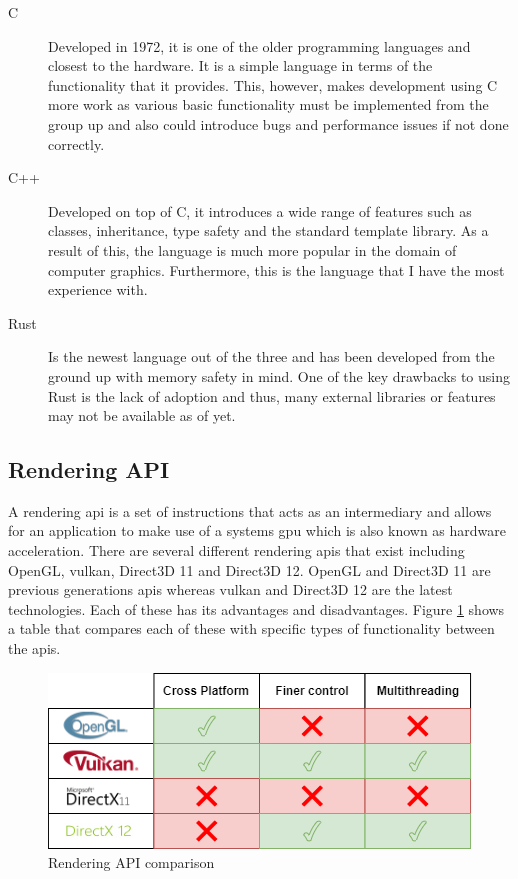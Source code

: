 \documentclass[11pt]{article}
\begin{document}
\begin{description}
  \item[C] Developed in 1972, it is one of the older programming languages and
    closest to the hardware. It is a simple language in terms of the
    functionality that it provides. This, however, makes development using C
    more work as various basic functionality must be implemented from the group
    up and also could introduce bugs and performance issues if not done
    correctly.
  \item[C++] Developed on top of C, it introduces a wide range of features such
    as classes, inheritance, type safety and the standard template library. As a
    result of this, the language is much more popular in the domain of computer
    graphics. Furthermore, this is the language that I have the most experience
    with.
  \item[Rust] Is the newest language out of the three and has been developed
    from the ground up with memory safety in mind. One of the key drawbacks to
    using Rust is the lack of adoption and thus, many external libraries or
    features may not be available as of yet.
\end{description}

\subsection{Rendering API} \label{rendering_api_tech_review} 

A rendering \gls*{api} is a set of instructions that acts as an intermediary and
allows for an application to make use of a systems \gls*{gpu} which is also
known as hardware acceleration. There are several different rendering
\glspl*{api} that exist including OpenGL, \gls*{vulkan}, Direct3D 11 and
Direct3D 12. OpenGL and Direct3D 11 are previous generations \glspl*{api}
whereas \gls*{vulkan} and Direct3D 12 are the latest technologies. Each of these
has its advantages and disadvantages. Figure \ref{fig:api_comparison} shows a
table that compares each of these with specific types of functionality between
the \glspl*{api}.

\begin{figure}[H]
  \centering
  \includegraphics[width=\textwidth]{images/api_comparison.png}
  \caption{Rendering API comparison}
  \label{fig:api_comparison}
\end{figure}
\end{document}
